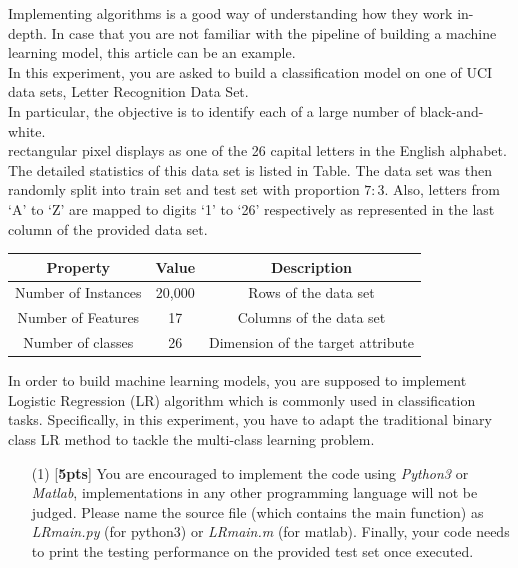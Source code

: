     \begin{problem}
        Implementing algorithms is a good way of understanding how they work in-depth. In case that you are not familiar with the pipeline of building a machine learning model, this article can be an example.\\
        In this experiment, you are asked to build a classification model on one of UCI data sets, Letter Recognition Data Set.\\
        In particular, the objective is to identify each of a large number of black-and-white.\\
        rectangular pixel displays as one of the 26 capital letters in the English alphabet. The detailed statistics of this data set is listed in Table. The data set was then randomly split into train set and test set with proportion $7:3$. Also, letters from `A' to `Z' are mapped to digits `1' to `26' respectively as represented in the last column of the provided data set.\\
        \begin{Table}
            \centering
            \vspace{2mm}
            \begin{tabular}{|c|c|c|}
                \hline
                Property & Value & Description\\
                \hline
                Number of Instances & 20,000 & Rows of the data set\\
                \hline
                Number of Features & 17 & Columns of the data set\\
                \hline
                Number of classes & 26 & Dimension of the target attribute \\
                \hline
            \end{tabular}
        \end{Table}

        In order to build machine learning models, you are supposed to implement Logistic Regression (LR) algorithm which is commonly used in classification tasks. Specifically, in this experiment, you have to adapt the traditional binary class LR method to tackle the multi-class learning problem.
        \begin{enumerate}
            \item[(1)] [\textbf{5pts}] You are encouraged to implement the code using \emph{Python3} or \emph{Matlab}, implementations in any other programming language will not be judged. Please name the source file (which contains the main function) as \emph{LR\underline{\hspace{0.5em}}main.py} (for python3) or \emph{LR\underline{\hspace{0.5em}}main.m} (for matlab). Finally, your code needs to print the testing performance on the provided test set once executed.


\end{enumerate}
\end{problem}
